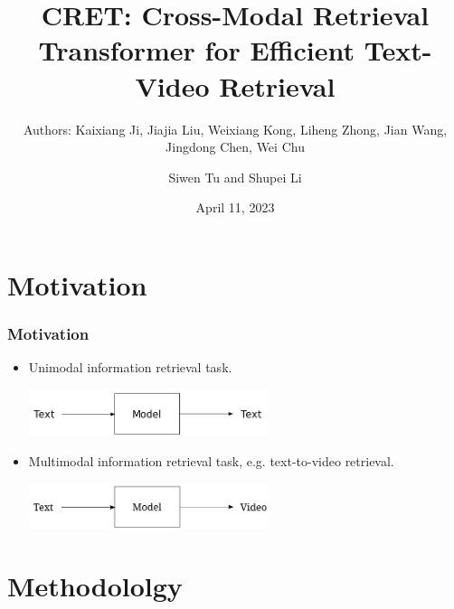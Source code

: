 \documentclass[notes, 10pt, aspectratio=169]{beamer}
\title{CRET: Cross-Modal Retrieval Transformer for Efficient Text-Video Retrieval}
\subtitle{Authors: Kaixiang Ji, Jiajia Liu, Weixiang Kong, Liheng Zhong, Jian Wang, Jingdong Chen, Wei Chu}
\author{Siwen Tu and Shupei Li}
\institute[LIACS]{Leiden Institute of Advanced Computer Science}
\date{April 11, 2023}
\begin{document}
\begin{frame}[plain]
	\titlepage
\end{frame}

\begin{frame}
	\tableofcontents
\end{frame}

\section{Motivation}
\begin{frame}
    \frametitle{Motivation}
    \begin{itemize}
        \item Unimodal information retrieval task.
            \vspace{0.1cm}
            \begin{center}
                \includegraphics[width=7cm]{single-modality.png}
            \end{center}
            \vspace{0.1cm}
        \item Multimodal information retrieval task, e.g. text-to-video retrieval.
            \vspace{0.1cm}
            \begin{center}
                \includegraphics[width=7cm]{multimodality.png}
            \end{center}
    \end{itemize}
\end{frame}

\section{Methodololgy}
\begin{frame}
    
\end{frame}
\end{document}
